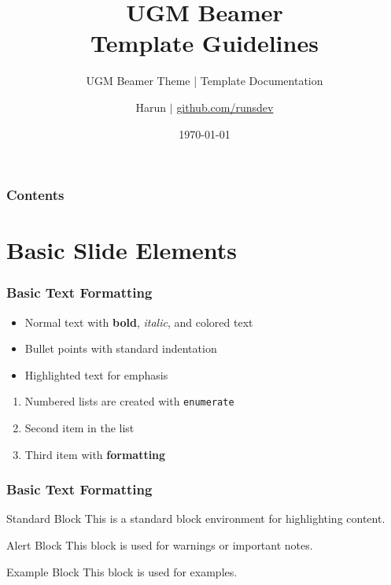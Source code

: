 \documentclass[aspectratio=169,professionalfonts]{beamer}
\title{UGM Beamer \\Template Guidelines}
\subtitle{UGM Beamer Theme | Template Documentation}
\author{Harun $|$ {\href{https://github.com/runsdev}{github.com/runsdev}}}
\date{\today}
\begin{document}
\begin{frame}[plain]
    \titlepage
\end{frame}

\begin{frame}
    \frametitle{Contents}
    
    \begin{multicols}{2}
        \tableofcontents
    \end{multicols}
\end{frame}

\section{Basic Slide Elements}

\begin{frame}
    \frametitle{Basic Text Formatting}
    
    \begin{itemize}
        \item Normal text with \textbf{bold}, \textit{italic}, and \textcolor{ugmBlue}{colored text}
        \item Bullet points with standard indentation
        \item \alert{Highlighted text} for emphasis
    \end{itemize}
    
    \begin{enumerate}
        \item Numbered lists are created with \texttt{enumerate}
        \item Second item in the list
        \item Third item with \textbf{formatting}
    \end{enumerate}
\end{frame}

\begin{frame}
    \frametitle{Basic Text Formatting}
    
    \begin{block}{Standard Block}
        This is a standard block environment for highlighting content.
    \end{block}
    
    \begin{alertblock}{Alert Block}
        This block is used for warnings or important notes.
    \end{alertblock}
    
    \begin{exampleblock}{Example Block}
        This block is used for examples.
    \end{exampleblock}
\end{frame}
\end{document}
